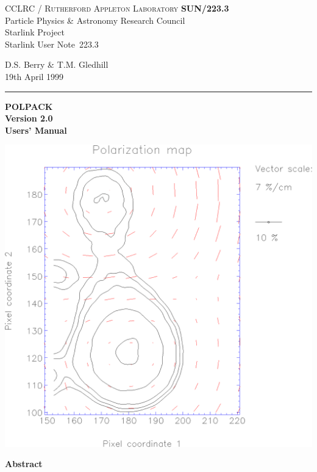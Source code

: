 \documentclass[twoside,11pt]{article}
\newcommand{\stardoccategory}  {Starlink User Note}
\newcommand{\stardocinitials}  {SUN}
\newcommand{\stardocnumber}    {223.3}
\newcommand{\stardocauthors}   {D.S. Berry \& T.M. Gledhill }
\newcommand{\stardocdate}      {19th April 1999}
\newcommand{\stardoctitle}     {POLPACK}
\newcommand{\stardocversion}   {Version 2.0}
\newcommand{\stardocmanual}    {Users' Manual}
\newcommand{\stardocname}{\stardocinitials /\stardocnumber}
\newenvironment{latexonly}{}{}
\renewcommand{\_}{\texttt{\symbol{95}}}
\begin{document}
\thispagestyle{empty}

\begin{latexonly}
   CCLRC / \textsc{Rutherford Appleton Laboratory} \hfill \textbf{\stardocname}\\
   {\large Particle Physics \& Astronomy Research Council}\\
   {\large Starlink Project\\}
   {\large \stardoccategory\ \stardocnumber}
   \begin{flushright}
   \stardocauthors\\
   \stardocdate
   \end{flushright}
   \vspace{-4mm}
   \rule{\textwidth}{0.5mm}
   \vspace{5mm}
   \begin{center}
   {\Huge\textbf{\stardoctitle \\ [2.5ex]}}
   {\LARGE\textbf{\stardocversion \\ [4ex]}}
   {\Huge\textbf{\stardocmanual}}
   \end{center}
   \vspace{5mm}

   \begin{center}
   \includegraphics[clip,scale=0.6]{sun223_figures/map2.eps}
   \end{center}

   \vspace{5mm}
   \begin{center}
      {\Large\textbf{Abstract}}
   \end{center}
\end{latexonly}
\end{document}
